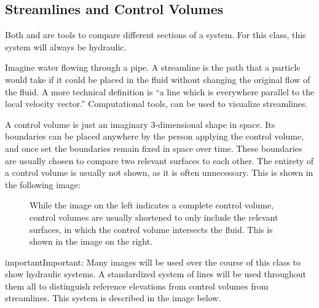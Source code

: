 \documentclass[letterpaper,10pt,english]{sphinxmanual}
\let\sphinxpxdimen\pdfpxdimen\else\newdimen\sphinxpxdimen
\begin{document}
\subsection{Streamlines and Control Volumes}
\label{\detokenize{Fluids_Review/Fluids_Review_Design:streamlines-and-control-volumes}}\label{\detokenize{Fluids_Review/Fluids_Review_Design:id5}}
Both  and  are tools to compare different sections of a system. For this class, this system will always be hydraulic.

Imagine water flowing through a pipe. A streamline is the path that a particle would take if it could be placed in the fluid without changing the original flow of the fluid. A more technical definition is “a line which is everywhere parallel to the local velocity vector.” Computational tools,  can be used to visualize streamlines.

A control volume is just an imaginary 3-dimensional shape in space. Its boundaries can be placed anywhere by the person applying the control volume, and once set the boundaries remain fixed in space over time. These boundaries are usually chosen to compare two relevant surfaces to each other. The entirety of a control volume is usually not shown, as it is often unnecessary. This is shown in the following image:

\begin{figure}[htbp]
\centering
\capstart

\noindent\sphinxincludegraphics[width=650\sphinxpxdimen]{{control_volume_simplification}.png}
\caption{While the image on the left indicates a complete control volume, control volumes are usually shortened to only include the relevant surfaces, in which the control volume intersects the fluid. This is shown in the image on the right.}\label{\detokenize{Fluids_Review/Fluids_Review_Design:id14}}\label{\detokenize{Fluids_Review/Fluids_Review_Design:control-volume-simplification}}\end{figure}

\begin{sphinxadmonition}{important}{Important:}
Many images will be used over the course of this class to show hydraulic systems. A standardized system of lines will be used throughout them all to distinguish reference elevations from control volumes from streamlines. This system is described in the image below.
\end{sphinxadmonition}
\end{document}
